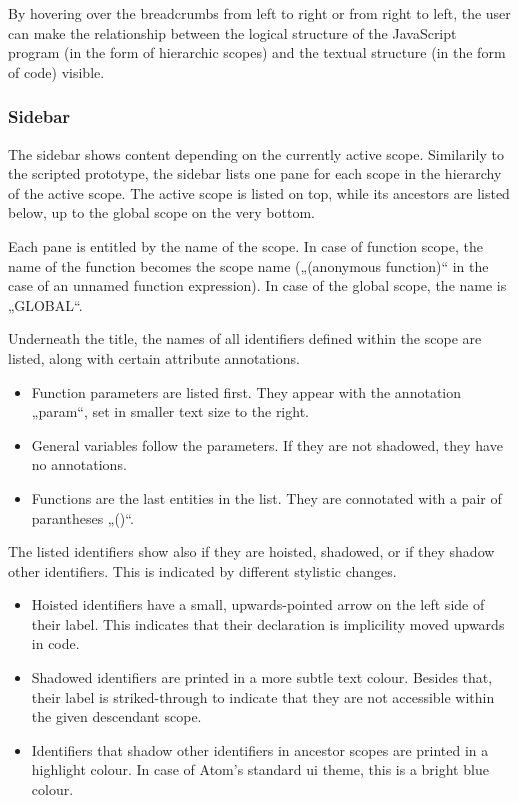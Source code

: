 By hovering over the breadcrumbs from left to right or from right to
left, the user can make the relationship between the logical structure
of the JavaScript program (in the form of hierarchic scopes) and the
textual structure (in the form of code) visible.

\subsubsection{Sidebar}\label{sidebar}

The sidebar shows content depending on the currently active scope.
Similarily to the scripted prototype, the sidebar lists one pane for
each scope in the hierarchy of the active scope. The active scope is
listed on top, while its ancestors are listed below, up to the global
scope on the very bottom.

Each pane is entitled by the name of the scope. In case of function
scope, the name of the function becomes the scope name („(anonymous
function)“ in the case of an unnamed function expression). In case of
the global scope, the name is „GLOBAL“.

Underneath the title, the names of all identifiers defined within the
scope are listed, along with certain attribute annotations.

\begin{itemize}
\itemsep1pt\parskip0pt
\item
  Function parameters are listed first. They appear with the annotation
  „param“, set in smaller text size to the right.
\item
  General variables follow the parameters. If they are not shadowed,
  they have no annotations.
\item
  Functions are the last entities in the list. They are connotated with
  a pair of parantheses „()“.
\end{itemize}

The listed identifiers show also if they are hoisted, shadowed, or if
they shadow other identifiers. This is indicated by different stylistic
changes.

\begin{itemize}
\itemsep1pt\parskip0pt
\item
  Hoisted identifiers have a small, upwards-pointed arrow on the left
  side of their label. This indicates that their declaration is
  implicility moved upwards in code.
\item
  Shadowed identifiers are printed in a more subtle text colour. Besides
  that, their label is striked-through to indicate that they are not
  accessible within the given descendant scope.
\item
  Identifiers that shadow other identifiers in ancestor scopes are
  printed in a highlight colour. In case of Atom’s standard \ac{ui}
  theme, this is a bright blue colour.
\end{itemize}

